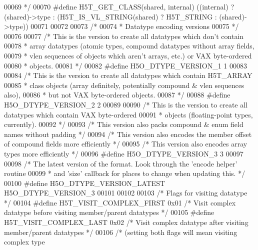 \begin{DoxyCode}
00069 \textcolor{comment}{ */}
00070 \textcolor{preprocessor}{#define H5T\_GET\_CLASS(shared, internal) ((internal) ? (shared)->type : (H5T\_IS\_VL\_STRING(shared) ? 
       H5T\_STRING : (shared)->type))}
00071 
00072 
00073 \textcolor{comment}{/*}
00074 \textcolor{comment}{ * Datatype encoding versions}
00075 \textcolor{comment}{ */}
00076 
00077 \textcolor{comment}{/* This is the version to create all datatypes which don't contain}
00078 \textcolor{comment}{ * array datatypes (atomic types, compound datatypes without array fields,}
00079 \textcolor{comment}{ * vlen sequences of objects which aren't arrays, etc.) or VAX byte-ordered}
00080 \textcolor{comment}{ * objects.}
00081 \textcolor{comment}{ */}
00082 \textcolor{preprocessor}{#define H5O\_DTYPE\_VERSION\_1 1}
00083 
00084 \textcolor{comment}{/* This is the version to create all datatypes which contain H5T\_ARRAY}
00085 \textcolor{comment}{ * class objects (array definitely, potentially compound & vlen sequences also),}
00086 \textcolor{comment}{ * but not VAX byte-ordered objects.}
00087 \textcolor{comment}{ */}
00088 \textcolor{preprocessor}{#define H5O\_DTYPE\_VERSION\_2 2}
00089 
00090 \textcolor{comment}{/* This is the version to create all datatypes which contain VAX byte-ordered}
00091 \textcolor{comment}{ * objects (floating-point types, currently).}
00092 \textcolor{comment}{ */}
00093 \textcolor{comment}{/* This version also packs compound & enum field names without padding */}
00094 \textcolor{comment}{/* This version also encodes the member offset of compound fields more efficiently */}
00095 \textcolor{comment}{/* This version also encodes array types more efficiently */}
00096 \textcolor{preprocessor}{#define H5O\_DTYPE\_VERSION\_3 3}
00097 
00098 \textcolor{comment}{/* The latest version of the format.  Look through the 'encode helper' routine}
00099 \textcolor{comment}{ *      and 'size' callback for places to change when updating this. */}
00100 \textcolor{preprocessor}{#define H5O\_DTYPE\_VERSION\_LATEST H5O\_DTYPE\_VERSION\_3}
00101 
00102 
00103 \textcolor{comment}{/* Flags for visiting datatype */}
00104 \textcolor{preprocessor}{#define H5T\_VISIT\_COMPLEX\_FIRST 0x01            }\textcolor{comment}{/* Visit complex datatype before visiting member/parent
       datatypes */}\textcolor{preprocessor}{}
00105 \textcolor{preprocessor}{#define H5T\_VISIT\_COMPLEX\_LAST  0x02            }\textcolor{comment}{/* Visit complex datatype after visiting member/parent
       datatypes */}\textcolor{preprocessor}{}
00106                                                 \textcolor{comment}{/* (setting both flags will mean visiting complex type
}
\end{DoxyCode}
